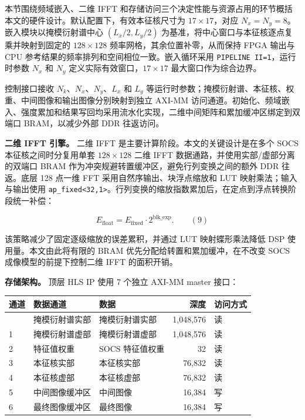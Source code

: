 \documentclass[
  preprint]{elsarticle}
\newcounter{none} %
\begin{document}
本节围绕频域嵌入、二维 IFFT
和存储访问三个决定性能与资源占用的环节概括本文的硬件设计。默认配置下，有效本征核尺寸为
\(17 \times 17\)，对应 \(N_x=N_y=8\)。嵌入模块以掩模衍射谱中心
\((L_x/2,L_y/2)\) 为基准，将中心窗口与本征核逐点复乘并映射到固定的
\(128 \times 128\) 频率网格，其余位置补零，从而保持 FPGA 输出与 CPU
参考结果的频率排列和空间相位一致。嵌入循环采用
\texttt{PIPELINE\ II=1}，运行时参数 \(N_x\) 和 \(N_y\)
定义实际有效窗口，\(17 \times 17\) 最大窗口作为综合边界。

控制接口接收 \(N_k\)、\(N_x\)、\(N_y\)、\(L_x\) 和 \(L_y\)
等运行时参数；掩模衍射谱、本征核、权重、中间图像和输出图像分别映射到独立
AXI-MM
访问通道。初始化、频域嵌入、强度累加和结果写回均采用流水化实现，二维中间矩阵和累加缓冲区绑定到双端口
BRAM，以减少外部 DDR 往返访问。

\textbf{二维 IFFT 引擎。} 二维 IFFT
是主要计算阶段。本文的关键设计是在多个 SOCS 本征核之间时分复用单套
\(128 \times 128\) 二维 IFFT 数据通路，并使用实部/虚部分离的双端口 BRAM
作为冲突规避转置缓冲区，避免行列变换之间的额外 DDR 往返。底层 128 点一维
FFT 采用自然序输出、块浮点缩放和 LUT 映射乘法；输入与输出使用
\texttt{ap\_fixed\textless{}32,1\textgreater{}}。行列变换的缩放指数累加后，在定点到浮点转换阶段统一补偿：

\[
E_{\mathrm{float}}=E_{\mathrm{fixed}}\cdot 2^{\mathrm{blk\_exp}}.
\qquad\mathrm{(9)}
\]

该策略减少了固定逐级缩放的误差累积，并通过 LUT 映射蝶形乘法降低 DSP
使用量。本文由此将有限的 BRAM 优先分配给转置和累加缓冲，在不改变 SOCS
成像模型的前提下控制二维 IFFT 的面积开销。

\textbf{存储架构。} 顶层 HLS IP 使用 7 个独立 AXI-MM master 接口：

{\def\LTcaptype{none} %
\begin{longtable}[]{@{}lllrl@{}}
\toprule\noalign{}
通道 & 数据通道 & 数据 & 深度 & 访问方式 \\
\midrule\noalign{}
\endhead
\bottomrule\noalign{}
\endlastfoot
0 & 掩模衍射谱实部 & 掩模衍射谱实部 & 1,048,576 & 读 \\
1 & 掩模衍射谱虚部 & 掩模衍射谱虚部 & 1,048,576 & 读 \\
2 & 特征值权重 & SOCS 特征值权重 & 32 & 读 \\
3 & 本征核实部 & 本征核实部 & 76,832 & 读 \\
4 & 本征核虚部 & 本征核虚部 & 76,832 & 读 \\
5 & 中间图像缓冲区 & 中间图像 & 16,384 & 写 \\
6 & 最终图像缓冲区 & 最终图像 & 16,384 & 写 \\
\end{longtable}
}
\end{document}
